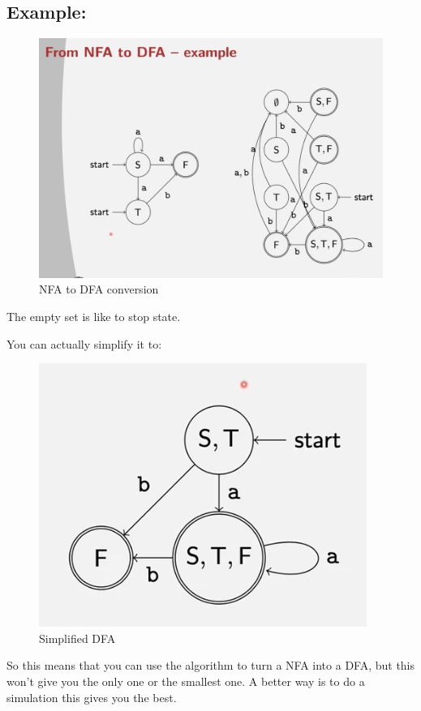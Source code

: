 \documentclass[
  11pt,
  british,
]{article}
\begin{document}
\hypertarget{example-9}{%
\subsection{Example:}\label{example-9}}

\begin{figure}
\centering
\includegraphics{Pasted_image_20211212165625.png}
\caption{NFA to DFA conversion}
\end{figure}

The empty set is like to stop state.

You can actually simplify it to:

\begin{figure}
\centering
\includegraphics{Pasted_image_20211212165811.png}
\caption{Simplified DFA}
\end{figure}

So this means that you can use the algorithm to turn a NFA into a DFA,
but this won't give you the only one or the smallest one. A better way
is to do a simulation this gives you the best.
\end{document}
